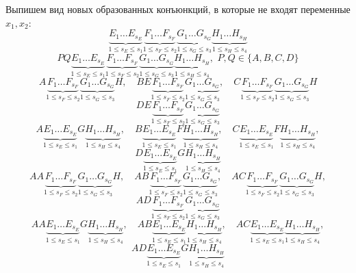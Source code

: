 \documentclass[12pt,a4paper,oneside,fleqn,leqno]{article}
\theoremstyle{definition}
\begin{document}
		Выпишем вид новых образованных конъюнкций, в которые не входят переменные $x_1, x_2:$
		$$
			\underbrace{E_1\ldots E_{s_E}}_{1\leqslant s_E \leqslant s_1}\underbrace{F_1\ldots F_{s_F}}_{1\leqslant s_F \leqslant s_2}\underbrace{G_1\ldots G_{s_G}}_{1\leqslant s_G \leqslant s_3}\underbrace{H_1\ldots H_{s_H}}_{1\leqslant s_H \leqslant s_4}
		$$
		$$
			PQ\underbrace{E_1\ldots E_{s_E}}_{1\leqslant s_E \leqslant s_1}\underbrace{F_1\ldots F_{s_F}}_{1\leqslant s_F \leqslant s_2}\underbrace{G_1\ldots G_{s_G}}_{1\leqslant s_G \leqslant s_3}\underbrace{H_1\ldots H_{s_H}}_{1\leqslant s_H \leqslant s_4},\,\,P,Q\in\{A, B, C, D \}
		$$
		\vspace{10pt}
		$$
			A\underbrace{F_1\ldots F_{s_F}}_{1\leqslant s_F \leqslant s_2}\underbrace{G_1\ldots G_{s_G}}_{1\leqslant s_G \leqslant s_3}H,\quad BE\underbrace{F_1\ldots F_{s_F}}_{1\leqslant s_F \leqslant s_2}\underbrace{G_1\ldots G_{s_G}}_{1\leqslant s_G \leqslant s_3},\quad C\underbrace{F_1\ldots F_{s_F}}_{1\leqslant s_F \leqslant s_2}\underbrace{G_1\ldots G_{s_G}}_{1\leqslant s_G \leqslant s_3}H
		$$
		\hfill $$DE\underbrace{F_1\ldots F_{s_F}}_{1\leqslant s_F \leqslant s_2}\underbrace{G_1\ldots G_{s_G}}_{1\leqslant s_G \leqslant s_3}$$
		$$
			A\underbrace{E_1\ldots E_{s_E}}_{1\leqslant s_E \leqslant s_1}G\underbrace{H_1\ldots H_{s_H}}_{1\leqslant s_H \leqslant s_4},\quad B\underbrace{E_1\ldots E_{s_E}}_{1\leqslant s_E \leqslant s_1}F\underbrace{H_1\ldots H_{s_H}}_{1\leqslant s_H \leqslant s_4},\quad C\underbrace{E_1\ldots E_{s_E}}_{1\leqslant s_E \leqslant s_1}F\underbrace{H_1\ldots H_{s_H}}_{1\leqslant s_H \leqslant s_4},$$ $$D\underbrace{E_1\ldots E_{s_E}}_{1\leqslant s_E \leqslant s_1}G\underbrace{H_1\ldots H_{s_H}}_{1\leqslant s_H \leqslant s_4}
		$$
		\vspace{10pt}
		$$
			AA\underbrace{F_1\ldots F_{s_F}}_{1\leqslant s_F \leqslant s_2}\underbrace{G_1\ldots G_{s_G}}_{1\leqslant s_G \leqslant s_3}H,\quad AB\underbrace{F_1\ldots F_{s_F}}_{1\leqslant s_F \leqslant s_2}\underbrace{G_1\ldots G_{s_G}}_{1\leqslant s_G \leqslant s_3},\quad AC\underbrace{F_1\ldots F_{s_F}}_{1\leqslant s_F \leqslant s_2}\underbrace{G_1\ldots G_{s_G}}_{1\leqslant s_G \leqslant s_3}H,$$ $$ AD\underbrace{F_1\ldots F_{s_F}}_{1\leqslant s_F \leqslant s_2}\underbrace{G_1\ldots G_{s_G}}_{1\leqslant s_G \leqslant s_3}
		$$
		$$
			AA\underbrace{E_1\ldots E_{s_E}}_{1\leqslant s_E \leqslant s_1}G\underbrace{H_1\ldots H_{s_H}}_{1\leqslant s_H \leqslant s_4},\quad AB\underbrace{E_1\ldots E_{s_E}}_{1\leqslant s_E \leqslant s_1}\underbrace{H_1\ldots H_{s_H}}_{1\leqslant s_H \leqslant s_4},\quad AC\underbrace{E_1\ldots E_{s_E}}_{1\leqslant s_E \leqslant s_1}\underbrace{H_1\ldots H_{s_H}}_{1\leqslant s_H \leqslant s_4}, $$ $$AD\underbrace{E_1\ldots E_{s_E}}_{1\leqslant s_E \leqslant s_1}G\underbrace{H_1\ldots H_{s_H}}_{1\leqslant s_H \leqslant s_4}
		$$
\end{document}
